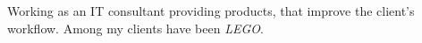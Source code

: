
Working as an IT consultant providing products, that improve the client's workflow. Among my clients have been \emph{LEGO}.
